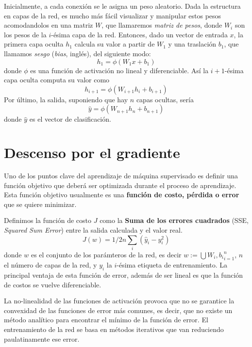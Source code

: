 Inicialmente, a cada conexión se le asigna un peso aleatorio. Dada la
estructura en capas de la red, es mucho más fácil visualizar y
manipular estos pesos acomodandolos en una matriz $W$, que llamaremos
\textit{matriz de pesos}, donde $W_i$ son los pesos de la $i$-ésima
capa de la red. Entonces, dado un vector de entrada $x$, la primera
capa oculta $h_1$ calcula su valor a partir de $W_1$ y una traslación
$b_1$, que llamamos \textit{sesgo} (\textit{bias}, inglés), del
siguiente modo:
\begin{equation}
  h_1 = \phi(W_1x + b_1)
\end{equation}
donde $\phi$ es una función de activación no lineal y
diferenciable. Así la $i+1$-ésima capa oculta computa su valor como
\begin{equation}
  h_{i+1} = \phi(W_{i+1}h_i + b_{i+1})
\end{equation}
Por último, la salida, suponiendo que hay $n$ capas ocultas, sería
\begin{equation}
  \hat{y} = \phi{(W_{n+1}h_n + b_{n+1})}
\end{equation}
donde $\hat{y}$ es el vector de clasificación.

\section{Descenso por el gradiente}
Uno de los puntos clave del aprendizaje de máquina supervisado es
definir una función objetivo que deberá ser optimizada durante el
proceso de aprendizaje. Esta función objetivo usualmente es una
\textbf{función de costo, pérdida o error} que se quiere minimizar.

Definimos la función de costo $J$ como la \textbf{Suma de los errores
  cuadrados} (SSE, \textit{Squared Sum Error}) entre la salida
  calculada y el valor real.
\begin{equation}
  J(w)=1/2n \sum_i (\hat{y}_i - y_i^2)
\end{equation}
donde $w$ es el conjunto de los parámteros de la red, es decir
$w:=\bigcup{W_i, b_i}_{i=1}^{n}$, $n$ el número de capas de la red, y
$y_i$ la $i$-ésima etiqueta de entrenamiento. La principal ventaja de
esta función de error, además de ser lineal es que la función de
costos se vuelve diferenciable.

La no-linealidad de las funciones de activación provoca que no se
garantice la convexidad de las funciones de error más comunes, es
decir, que no existe un método analítico para encontrar el mínimo de
la función de error. El entrenamiento de la red se basa en métodos
iterativos que van reduciendo paulatinamente ese error.

